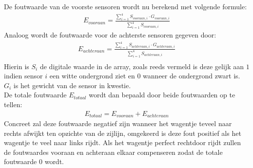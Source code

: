 De foutwaarde van de voorste sensoren wordt nu berekend met volgende formule:
\begin{gather*}
E_{vooraan} = \frac{\sum\limits_{i=1}^{4}S_{vooraan,i}\cdot G_{vooraan,i}}{\sum\limits_{i=1}^{4}S_{vooraan,i}}
\end{gather*}
Analoog wordt de foutwaarde voor de achterste sensoren gegeven door:
\begin{gather*}
E_{achteraan} = \frac{\sum\limits_{i=1}^{4}S_{achteraan,i}\cdot G_{achteraan,i}}{\sum\limits_{i=1}^{4}S_{achteraan,i}}\\
\end{gather*}
Hierin is $S_i$ de digitale waarde in de array, zoals reeds vermeld is deze gelijk aan $1$ indien sensor $i$ een witte ondergrond ziet en $0$ wanneer de ondergrond zwart is. $G_i$ is het gewicht van de sensor in kwestie.\\
De totale foutwaarde $E_{totaal}$ wordt dan bepaald door beide foutwaarden op te tellen:
\begin{gather*}
E_{totaal}=E_{vooraan}+E_{achteraan}
\end{gather*}
Concreet zal deze foutwaarde negatief zijn wanneer het wagentje teveel naar rechts afwijkt ten opzichte van de zijlijn, omgekeerd is deze fout positief als het wagentje te veel naar links rijdt. Als het wagentje perfect rechtdoor rijdt zullen de foutwaardes vooraan en achteraan elkaar compenseren zodat de totale foutwaarde $0$ wordt. 

